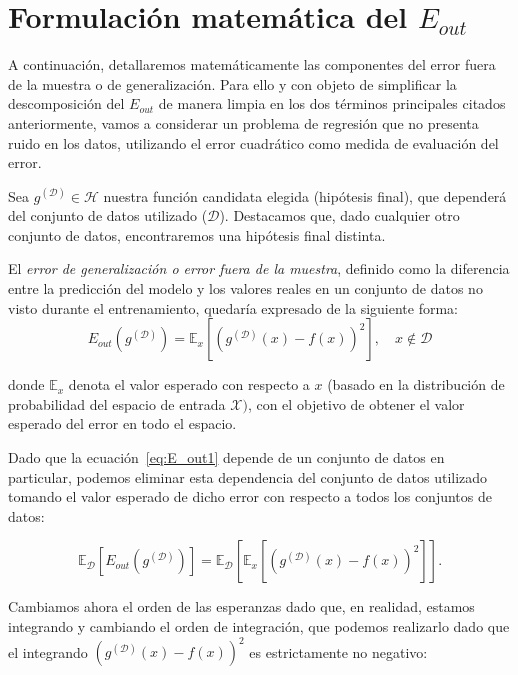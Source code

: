 \section{Formulación matemática del $E_{out}$}\label{sec:formulacion-matematica-Eout}
A continuación, detallaremos matemáticamente las componentes del error fuera de la muestra o de generalización. Para ello y con objeto de simplificar la descomposición del $E_{out}$ de manera limpia en los dos términos principales citados anteriormente, vamos a considerar un problema de regresión que no presenta ruido en los datos, utilizando el error cuadrático como medida de evaluación del error.\newline

Sea $g^{\mathcal{(D)}} \in \mathcal{H}$ nuestra función candidata elegida (hipótesis final), que dependerá del conjunto de datos utilizado ($\mathcal{D}$). Destacamos que, dado cualquier otro conjunto de datos, encontraremos una hipótesis final distinta.\newline

El \emph{error de generalización o error fuera de la muestra}, definido como la diferencia entre la predicción del modelo y los valores reales en un conjunto de datos no visto durante el entrenamiento, quedaría expresado de la siguiente forma:
\begin{equation}\label{eq:E_out1}
    E_{out}(g^{\mathcal{(D)}}) = \mathbb{E}_{x}[{(g^{\mathcal{(D)}}(x) - f(x))}^2], \quad x \notin \mathcal{D}
\end{equation}

donde $\mathbb{E}_{x}$ denota el valor esperado con respecto a $x$ (basado en la distribución de probabilidad del espacio de entrada $\mathcal{X})$, con el objetivo de obtener el valor esperado del error en todo el espacio.\newline

Dado que la ecuación~\eqref{eq:E_out1} depende de un conjunto de datos en particular, podemos eliminar esta dependencia del conjunto de datos utilizado tomando el valor esperado de dicho error con respecto a todos los conjuntos de datos:

\begin{equation}\label{eq:E_out2}
    \mathbb{E}_{\mathcal{D}}[E_{out}(g^{\mathcal{(D)}})] = \mathbb{E}_{\mathcal{D}}[\mathbb{E}_{x}[{(g^{\mathcal{(D)}}(x) - f(x))}^2]]. 
\end{equation}\newline

Cambiamos ahora el orden de las esperanzas dado que, en realidad, estamos integrando y cambiando el orden de integración, que podemos realizarlo dado que el integrando ${(g^{\mathcal{(D)}}(x) - f(x))}^2$ es estrictamente no negativo:

